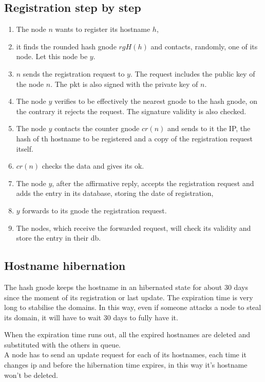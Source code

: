 \documentclass[a4paper]{article}
\begin{document}
\subsection{Registration step by step} 
\begin{enumerate}
	\item The node $n$ wants to register its hostname $h$,
	\item it finds the rounded hash gnode $rgH(h)$ and contacts, randomly,
		one of its node. Let this node be $y$.
	\item $n$ sends the registration request to $y$. The request includes
		the public key of the node $n$. The pkt is also signed with
		the private key of $n$.
	\item The node $y$ verifies to be effectively the nearest gnode to the
		hash gnode, on the contrary it rejects the request.
		The signature validity is also checked.
	\item The node $y$ contacts the counter gnode $cr(n)$ and sends to it
		the IP, the hash of th hostname to be registered and a copy of
		the registration request itself.
	\item $cr(n)$ checks the data and gives its ok.
	\item The node $y$, after the affirmative reply, accepts the
		registration request and adds the entry in its database,
		storing the date of registration,
	\item $y$ forwards to its gnode the registration request.
	\item The nodes, which receive the forwarded request, will check its
		validity and store the entry in their db.
\end{enumerate}
  
\subsection{Hostname hibernation}

The hash gnode keeps the hostname in an hibernated state for about 30 days
since the moment of its registration or last update.
The expiration time is very long to stabilise the domains. In this way, even
if someone attacks a node to steal its domain, it will have to wait 30 days
to fully have it.

When the expiration time runs out, all the expired hostnames are deleted and
substituted with the others in queue.\\
A node has to send an update request for each of its hostnames, each time it
changes ip and before the hibernation time expires, in this way it's
hostname won't be deleted.
\end{document}
